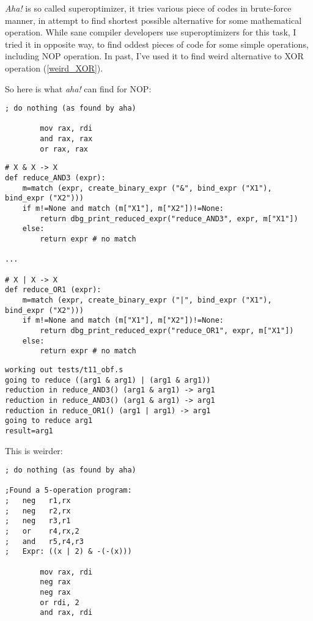 \textit{Aha!} is so called superoptimizer, it tries various piece of codes in brute-force manner, in attempt
to find shortest possible alternative for some mathematical operation.
While sane compiler developers use superoptimizers for this task, I tried it in opposite way, to find oddest
pieces of code for some simple operations, including \ac{NOP} operation.
In past, I've used it to find weird alternative to XOR operation (\ref{weird_XOR}).

So here is what \textit{aha!} can find for \ac{NOP}:

\begin{lstlisting}
; do nothing (as found by aha)

        mov rax, rdi
        and rax, rax
        or rax, rax
\end{lstlisting}

\begin{lstlisting}
# X & X -> X
def reduce_AND3 (expr):
    m=match (expr, create_binary_expr ("&", bind_expr ("X1"), bind_expr ("X2")))
    if m!=None and match (m["X1"], m["X2"])!=None:
        return dbg_print_reduced_expr("reduce_AND3", expr, m["X1"])
    else:
        return expr # no match

...

# X | X -> X
def reduce_OR1 (expr):
    m=match (expr, create_binary_expr ("|", bind_expr ("X1"), bind_expr ("X2")))
    if m!=None and match (m["X1"], m["X2"])!=None:
        return dbg_print_reduced_expr("reduce_OR1", expr, m["X1"])
    else:
        return expr # no match
\end{lstlisting}

\begin{lstlisting}
working out tests/t11_obf.s
going to reduce ((arg1 & arg1) | (arg1 & arg1))
reduction in reduce_AND3() (arg1 & arg1) -> arg1
reduction in reduce_AND3() (arg1 & arg1) -> arg1
reduction in reduce_OR1() (arg1 | arg1) -> arg1
going to reduce arg1
result=arg1
\end{lstlisting}

This is weirder:

\begin{lstlisting}
; do nothing (as found by aha)

;Found a 5-operation program:
;   neg   r1,rx
;   neg   r2,rx
;   neg   r3,r1
;   or    r4,rx,2
;   and   r5,r4,r3
;   Expr: ((x | 2) & -(-(x)))

        mov rax, rdi
        neg rax
        neg rax
        or rdi, 2
        and rax, rdi
\end{lstlisting}

